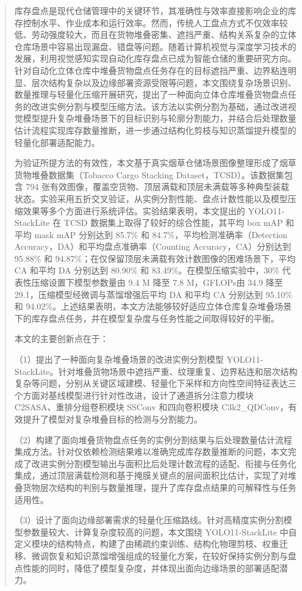 \begin{abstract}
库存盘点是现代仓储管理中的关键环节，其准确性与效率直接影响企业的库存控制水平、作业成本和运行效率。然而，传统人工盘点方式不仅效率较低、劳动强度较大，而且在货物堆叠密集、遮挡严重、结构关系复杂的立体仓库场景中容易出现漏盘、错盘等问题。随着计算机视觉与深度学习技术的发展，利用视觉感知实现自动化库存盘点已成为智能仓储的重要研究方向。针对自动化立体仓库中堆叠货物盘点任务存在的目标遮挡严重、边界粘连明显、层次结构复杂以及边缘部署资源受限等问题，本文围绕复杂场景识别、数量推理与轻量化压缩开展研究，提出了一种面向立体仓库堆叠货物盘点任务的改进实例分割与模型压缩方法。该方法以实例分割为基础，通过改进视觉模型提升复杂堆叠场景下的目标识别与轮廓分割能力，并结合后处理数量估计流程实现库存数量推断，进一步通过结构化剪枝与知识蒸馏提升模型的轻量化部署适配能力。

为验证所提方法的有效性，本文基于真实烟草仓储场景图像整理形成了烟草货物堆叠数据集（Tobacco Cargo Stacking Dataset，TCSD）。该数据集包含 794 张有效图像，覆盖空货物、顶层满载和顶层未满载等多种典型装载状态。实验采用五折交叉验证，从实例分割性能、盘点计数性能以及模型压缩效果等多个方面进行系统评估。实验结果表明，本文提出的 YOLO11-StackLite 在 TCSD 数据集上取得了较好的综合性能，其平均 box mAP 和平均 mask mAP 分别达到 85.7\% 和 84.7\%，平均检测准确率（Detection Accuracy，DA）和平均盘点准确率（Counting Accuracy，CA）分别达到 95.88\% 和 94.87\%；在仅保留顶层未满载有效计数图像的困难场景下，平均 CA 和平均 DA 分别达到 80.90\% 和 83.49\%。在模型压缩实验中，30\% 代表性压缩设置下模型参数量由 9.4 M 降至 7.8 M，GFLOPs由 34.9 降至 29.1，压缩模型经微调与蒸馏增强后平均 DA 和平均 CA 分别达到 95.10\% 和 94.02\%。上述结果表明，本文方法能够较好适应立体仓库复杂堆叠场景下的库存盘点任务，并在模型复杂度与任务性能之间取得较好的平衡。

本文的主要创新点在于：

（1）提出了一种面向复杂堆叠场景的改进实例分割模型 YOLO11-StackLite。针对堆叠货物场景中遮挡严重、纹理重复、边界粘连和层次结构复杂等问题，分别从关键区域建模、轻量化下采样和方向性空间特征表达三个方面对基线模型进行针对性改进，设计了通道拆分注意力模块 C2SASA、重排分组卷积模块 SSConv 和四向卷积模块 C3k2\_QDConv，有效提升了模型对复杂堆叠目标的检测与分割能力。

（2）构建了面向堆叠货物盘点任务的实例分割结果与后处理数量估计流程集成方法。针对仅依赖检测结果难以准确完成库存数量推断的问题，本文完成了改进实例分割模型输出与面积比后处理计数流程的适配、衔接与任务化集成，通过顶层满载检测和基于掩膜关键点的层间面积比估计，实现了对堆叠货物层次结构的判别与数量推理，提升了库存盘点结果的可解释性与任务适用性。

（3）设计了面向边缘部署需求的轻量化压缩路线。针对高精度实例分割模型参数量较大、计算复杂度较高的问题，本文围绕 YOLO11-StackLite 中自定义模块的结构特点，构建了由稀疏约束训练、结构化物理剪枝、权重迁移、微调恢复和知识蒸馏增强组成的轻量化方案，在较好保持实例分割与盘点性能的同时，降低了模型复杂度，并体现出面向边缘场景的部署适配潜力。
\end{abstract}

